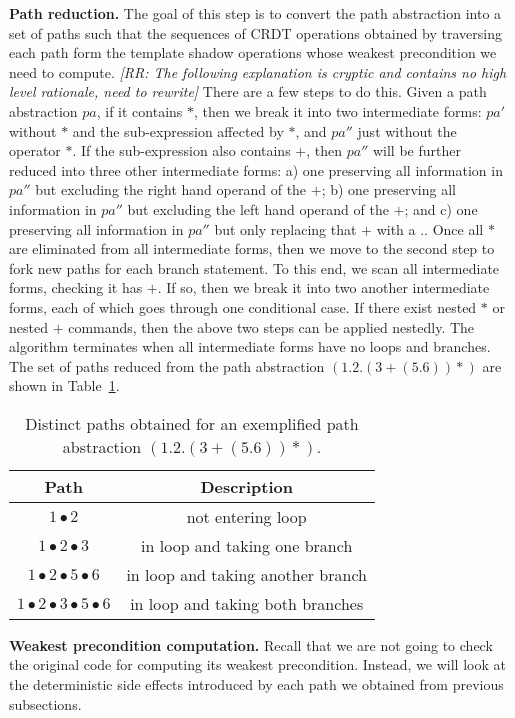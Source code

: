 {\bf Path reduction.} The goal of this step is to convert the path abstraction into a set
of paths such that the sequences of CRDT operations obtained by traversing each path form
the template shadow operations whose weakest precondition we need to compute.
{\em [RR: The following explanation is cryptic and contains no high level rationale, need to rewrite]} 
There are a few steps to do this. Given a path 
abstraction $pa$, if it contains $*$, then we break it into two intermediate forms: 
$pa'$ without $*$ and the sub-expression affected by $*$, and  $pa''$ just without the operator $*$. 
If the sub-expression also contains $+$, then $pa''$ will be further reduced into three other intermediate
forms: a) one preserving all information in $pa''$ but excluding the right hand operand of the $+$; b)
one preserving all information in $pa''$ but excluding the left hand operand of the $+$; and c) one preserving
all information in $pa''$ but only replacing that $+$ with a $.$. 
Once all $*$ are eliminated from all intermediate forms, 
then we move to the second step to fork new paths for each branch statement. To this end, we scan all intermediate
forms, checking it has $+$. If so, then we break it into two another intermediate forms,
each of which goes through one conditional case. If there exist nested $*$ or nested $+$ commands, then
the above two steps can be applied nestedly. The algorithm terminates when
all intermediate forms have no loops and branches. The set of paths
reduced from the path abstraction $(1.2.(3+(5.6))*)$ are shown in Table~\ref{tab:pathreduce}.

\begin{table}[ht]
\centering
\begin{tabular}{|c|c|}
\hline
Path & Description \\\hline
$1\bullet2$ & not entering loop\\
$1\bullet2\bullet3$ & in loop and taking one branch\\
$1\bullet2\bullet5\bullet6$ & in loop and taking another branch\\
$1\bullet2\bullet3\bullet5\bullet6$ & in loop and taking both branches\\
\hline
\end{tabular}
\caption{Distinct paths obtained for an exemplified path abstraction $(1.2.(3+(5.6))*)$.}
\label{tab:pathreduce}
\end{table}

{\bf Weakest precondition computation.}
Recall that we are not going to check the original code for computing its
weakest precondition. Instead, we will look at the deterministic side effects introduced
by each path we obtained from previous subsections. 

